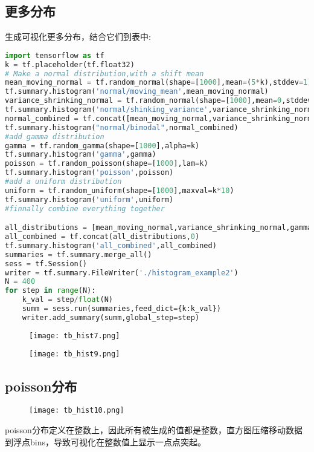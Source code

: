 \subsection{更多分布}
生成可视化更多分布，结合它们到表中:
\begin{lstlisting}[language=Python]
import tensorflow as tf
k = tf.placeholder(tf.float32)
# Make a normal distribution,with a shift mean
mean_moving_normal = tf.random_normal(shape=[1000],mean=(5*k),stddev=1)
tf.summary.histogram('normal/moving_mean',mean_moving_normal)
variance_shrinking_normal = tf.random_normal(shape=[1000],mean=0,stddev=1-(k))
tf.summary.histogram('normal/shinking_variance',variance_shrinking_normal)
normal_combined = tf.concat([mean_moving_normal,variance_shrinking_normal],0)
tf.summary.histogram("normal/bimodal",normal_combined)
#add gamma distribution
gamma = tf.random_gamma(shape=[1000],alpha=k)
tf.summary.histogram('gamma',gamma)
poisson = tf.random_poisson(shape=[1000],lam=k)
tf.summary.histogram('poisson',poisson)
#add a uniform distribution
uniform = tf.random_uniform(shape=[1000],maxval=k*10)
tf.summary.histogram('uniform',uniform)
#finnally combine everything together

all_distributions = [mean_moving_normal,variance_shrinking_normal,gamma,poisson,uniform]
all_combined = tf.concat(all_distributions,0)
tf.summary.histogram('all_combined',all_combined)
summaries = tf.summary.merge_all()
sess = tf.Session()
writer = tf.summary.FileWriter('./histogram_example2')
N = 400
for step in range(N):
    k_val = step/float(N)
    summ = sess.run(summaries,feed_dict={k:k_val})
    writer.add_summary(summ,global_step=step)
\end{lstlisting}
\begin{center}
\begin{figure}[H]
\texttt{[image: tb\_hist7.png]}
\end{figure}
\end{center}
\begin{center}
\begin{figure}
\texttt{[image: tb\_hist9.png]}
\end{figure}
\end{center}
\subsection{poisson分布}
\begin{center}
\begin{figure}[H]
\texttt{[image: tb\_hist10.png]}
\end{figure}
\end{center}
poisson分布定义在整数上，因此所有被生成的值都是整数，直方图压缩移动数据到浮点bins，导致可视化在整数值上显示一点点突起。
